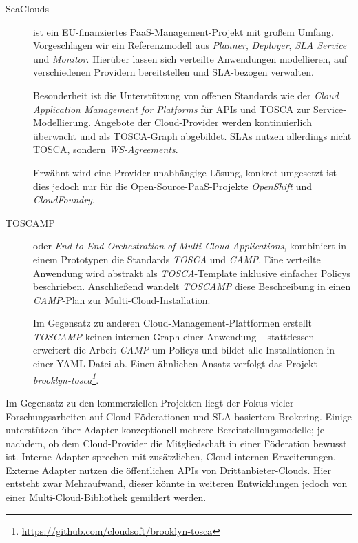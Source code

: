 \begin{description}
	
	\item[SeaClouds] ist ein EU-finanziertes PaaS-Management-Projekt mit großem Umfang. Vorgeschlagen wir ein Referenzmodell aus \emph{Planner}, \emph{Deployer}, \emph{SLA Service} und \emph{Monitor}. Hierüber lassen sich verteilte Anwendungen modellieren, auf verschiedenen Providern bereitstellen und SLA-bezogen verwalten.
	
	Besonderheit ist die Unterstützung von offenen Standards wie der \emph{Cloud Application Management for Platforms} für APIs und TOSCA zur Service-Modellierung. Angebote der Cloud-Provider werden kontinuierlich überwacht und als TOSCA-Graph abgebildet. SLAs nutzen allerdings nicht TOSCA, sondern \emph{WS-Agreements}.
		
	Erwähnt wird eine Provider-unabhängige Lösung, konkret umgesetzt ist dies jedoch nur für die Open-Source-PaaS-Projekte \emph{OpenShift} und \emph{CloudFoundry}.
	
	\item[TOSCAMP] oder \emph{End-to-End Orchestration of
	Multi-Cloud Applications}, kombiniert in einem Prototypen die Standards \emph{TOSCA} und \emph{CAMP}. Eine verteilte Anwendung wird abstrakt als \emph{TOSCA}-Template inklusive einfacher Policys beschrieben. Anschließend wandelt \emph{TOSCAMP} diese Beschreibung in einen \emph{CAMP}-Plan zur Multi-Cloud-Installation.

	Im Gegensatz zu anderen Cloud-Management-Plattformen erstellt \emph{TOSCAMP} keinen internen Graph einer Anwendung -- stattdessen erweitert die Arbeit \emph{CAMP} um Policys und bildet alle Installationen in einer YAML-Datei ab. Einen ähnlichen Ansatz verfolgt das Projekt \emph{brooklyn-tosca\footnote{\url{https://github.com/cloudsoft/brooklyn-tosca}}}.
	
%	
%	
%	
	
\end{description}



\noindent
Im Gegensatz zu den kommerziellen Projekten liegt der Fokus vieler Forschungsarbeiten auf Cloud-Föderationen und SLA-basiertem Brokering. Einige unterstützen über Adapter konzeptionell mehrere Bereitstellungsmodelle; je nachdem, ob dem Cloud-Provider die Mitgliedschaft in einer Föderation bewusst ist. Interne Adapter sprechen mit zusätzlichen, Cloud-internen Erweiterungen. Externe Adapter nutzen die öffentlichen APIs von Drittanbieter-Clouds. Hier entsteht zwar Mehraufwand, dieser könnte in weiteren Entwicklungen jedoch von einer Multi-Cloud-Bibliothek gemildert werden.

